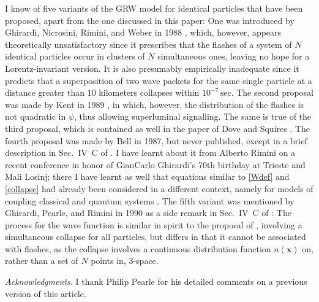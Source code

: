\documentclass[12pt]{article}
\newcommand{\vx}{\boldsymbol{x}}
\newcommand{\1}{1}
\newcommand{\z}[1]{{#1}}
\begin{document}
I know of \z{five} variants of the GRW model for identical particles that have been proposed, \z{apart from the one discussed in this paper}: One was introduced by Ghirardi, Nicrosini, Rimini, and Weber in 1988 \cite{GNRW88}, which, however, appears theoretically unsatisfactory since it prescribes that the flashes of a system of $N$ identical particles occur in clusters of $N$ simultaneous ones, leaving no hope for a Lorentz-invariant version. It is also presumably empirically inadequate since it predicts that a superposition of two wave packets for the same single particle at a distance greater than 10 kilometers collapses within $10^{-7} \, \mathrm{sec}$. The second proposal was made by Kent in 1989 \cite{kent}, in which, however, the distribution of the flashes is not quadratic in $\psi$, thus allowing superluminal signalling. \z{The same is true of the third proposal, which is contained as well in the paper of Dove and Squires \cite{DS95}.} The \z{fourth} proposal was made by Bell in 1987, but never published, \z{except in a brief description in Sec.~IV~C of \cite{GPR90}}. I have learnt about it from Alberto Rimini on a recent conference in honor of GianCarlo Ghirardi's 70th birthday at Trieste and Mali Losinj; there I have learnt as well that equations similar to \eqref{Wdef} and \eqref{collapse} had already been considered in a different context, namely for models of coupling classical and quantum systems \cite{BJ95}. \z{The fifth variant was mentioned by Ghirardi, Pearle, and Rimini in 1990 as a side remark in Sec.~IV~C of \cite{GPR90}: The process for the wave function is similar in spirit to the proposal of \cite{GNRW88}, involving a simultaneous collapse for all particles, but differs in that it cannot be associated with flashes, as the collapse involves a continuous distribution function $n(\vx)$ on, rather than a set of $N$ points in, 3-space.}

\bigskip

\noindent\textit{Acknowledgments.} \z{I thank Philip Pearle for his detailed comments on a previous version of this article.}
\end{document}
